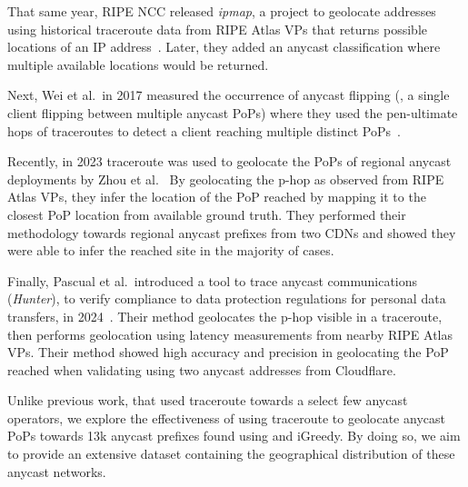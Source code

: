 That same year, RIPE NCC released \textit{ipmap}, a project to geolocate addresses using historical traceroute data from RIPE Atlas VPs
that returns possible locations of an IP address~\cite{ipmap}.
Later, they added an anycast classification where multiple available locations would be returned.

Next, Wei et al.~in 2017 measured the occurrence of anycast flipping (\ie, a single client flipping between multiple anycast PoPs) where they used the pen-ultimate hops of traceroutes to detect a client reaching multiple distinct PoPs~\cite{flipping}.

Recently, in 2023 traceroute was used to geolocate the PoPs of regional anycast deployments by Zhou et al.~\cite{regional}
By geolocating the p-hop as observed from RIPE Atlas VPs,
they infer the location of the PoP reached by mapping it to the closest PoP location from available ground truth.
They performed their methodology towards regional anycast prefixes from two CDNs and showed they were able to infer the reached site in the majority of cases.

Finally, Pascual et al.~introduced a tool to trace anycast communications (\textit{Hunter}), to verify compliance to data protection regulations for personal data transfers, in 2024~\cite{hunter}.
Their method geolocates the p-hop visible in a traceroute, then performs geolocation using latency measurements from nearby RIPE Atlas VPs.
Their method showed high accuracy and precision in geolocating the PoP reached when validating using two anycast addresses from Cloudflare.

Unlike previous work, that used traceroute towards a select few anycast operators, we explore the effectiveness of using traceroute to geolocate anycast PoPs towards 13k anycast prefixes found using \manycasttwo and iGreedy.
By doing so, we aim to provide an extensive dataset containing the geographical distribution of these anycast networks.
